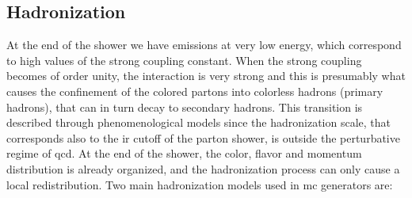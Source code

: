 \subsection{Hadronization}

At the end of the shower we have emissions at very low energy, which correspond to high values of the strong coupling constant. 
When the strong coupling becomes of order unity, the interaction is very strong and this is presumably what causes the confinement of the colored partons into colorless hadrons (primary hadrons), 
that can in turn decay to secondary hadrons. This transition is described through phenomenological models since the hadronization scale, that corresponds also to the \gls{ir} cutoff of the parton shower, is outside the perturbative regime of \gls{qcd}. At the end of the shower, the color, flavor and momentum distribution is already organized, and the hadronization process can only cause a local redistribution.
Two main hadronization models used in \gls{mc} generators are:

